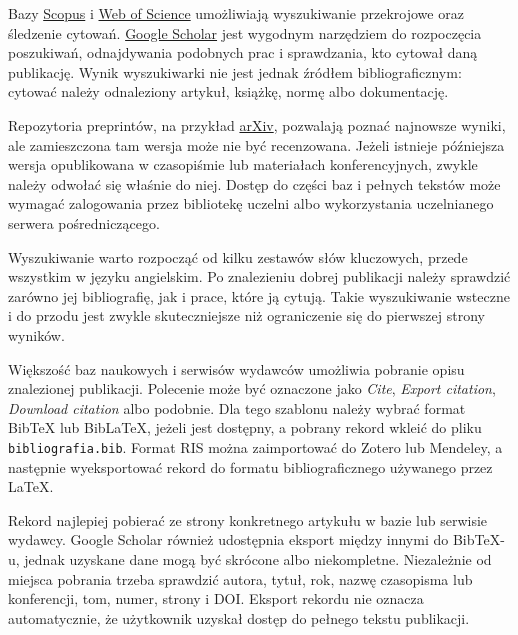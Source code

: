 Bazy \href{https://www.scopus.com/}{Scopus} i \href{https://www.webofscience.com/}{Web of Science} umożliwiają wyszukiwanie przekrojowe oraz śledzenie cytowań. \href{https://scholar.google.com/}{Google Scholar} jest wygodnym narzędziem do rozpoczęcia poszukiwań, odnajdywania podobnych prac i sprawdzania, kto cytował daną publikację. Wynik wyszukiwarki nie jest jednak źródłem bibliograficznym: cytować należy odnaleziony artykuł, książkę, normę albo dokumentację.

Repozytoria preprintów, na przykład \href{https://arxiv.org/}{arXiv}, pozwalają poznać najnowsze wyniki, ale zamieszczona tam wersja może nie być recenzowana. Jeżeli istnieje późniejsza wersja opublikowana w czasopiśmie lub materiałach konferencyjnych, zwykle należy odwołać się właśnie do niej. Dostęp do części baz i pełnych tekstów może wymagać zalogowania przez bibliotekę uczelni albo wykorzystania uczelnianego serwera pośredniczącego.

Wyszukiwanie warto rozpocząć od kilku zestawów słów kluczowych, przede wszystkim w języku angielskim. Po znalezieniu dobrej publikacji należy sprawdzić zarówno jej bibliografię, jak i prace, które ją cytują. Takie wyszukiwanie wsteczne i do przodu jest zwykle skuteczniejsze niż ograniczenie się do pierwszej strony wyników.

Większość baz naukowych i serwisów wydawców umożliwia pobranie opisu znalezionej publikacji. Polecenie może być oznaczone jako \emph{Cite}, \emph{Export citation}, \emph{Download citation} albo podobnie. Dla tego szablonu należy wybrać format BibTeX lub BibLaTeX, jeżeli jest dostępny, a pobrany rekord wkleić do pliku \texttt{bibliografia.bib}. Format RIS można zaimportować do Zotero lub Mendeley, a następnie wyeksportować rekord do formatu bibliograficznego używanego przez LaTeX.

Rekord najlepiej pobierać ze strony konkretnego artykułu w bazie lub serwisie wydawcy. Google Scholar również udostępnia eksport między innymi do BibTeX-u, jednak uzyskane dane mogą być skrócone albo niekompletne. Niezależnie od miejsca pobrania trzeba sprawdzić autora, tytuł, rok, nazwę czasopisma lub konferencji, tom, numer, strony i DOI. Eksport rekordu nie oznacza automatycznie, że użytkownik uzyskał dostęp do pełnego tekstu publikacji.

\subsection{}

